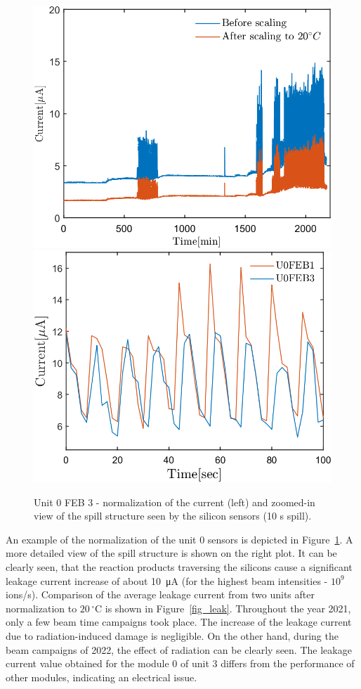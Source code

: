 \begin{figure}[!h]
\centering
\includegraphics[width=0.45\columnwidth]{Chapter6/DCS/images/uranium/current_U_highintensity.png}
\includegraphics[width=0.47\columnwidth]{Chapter6/DCS/images/uranium/U3L1_spill.png}
\caption{Unit 0 \gls{FEB} 3 - normalization of the current (left) and zoomed-in view of the spill structure seen by the silicon sensors (10 s spill).}
\label{fig_sensors_spill}
\end{figure}

An example of the normalization of the unit 0 sensors is depicted in Figure~\ref{fig_sensors_spill}. A more detailed view of the spill structure is shown on the right plot. It can be clearly seen, that the reaction products traversing the silicons cause a significant leakage current increase of about \SI{10}{\micro A} (for the highest beam intensities - $10^{9}$ ions/s). Comparison of the average leakage current from two units after normalization to $20\,^{\circ}$C is shown in Figure~\ref{fig_leak}. Throughout the year 2021, only a few beam time campaigns took place. The increase of the leakage current due to radiation-induced damage is negligible. On the other hand, during the beam campaigns of 2022, the effect of radiation can be clearly seen. The leakage current value obtained for the module 0 of unit 3 differs from the performance of other modules, indicating an electrical issue.

